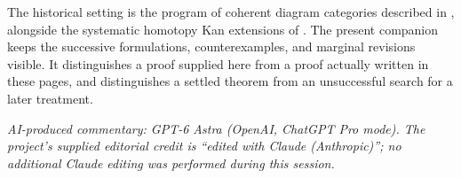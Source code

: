 The historical setting is the program of coherent diagram categories described in \citet[\S69]{Grothendieck1983}, alongside the systematic homotopy Kan extensions of \citet{Heller1988}. The present companion keeps the successive formulations, counterexamples, and marginal revisions visible. It distinguishes a proof supplied here from a proof actually written in these pages, and distinguishes a settled theorem from an unsuccessful search for a later treatment.

\medskip
\noindent\small\textit{AI-produced commentary: GPT-6 Astra (OpenAI, ChatGPT Pro mode). The project's supplied editorial credit is ``edited with Claude (Anthropic)''; no additional Claude editing was performed during this session.}
\endgroup
